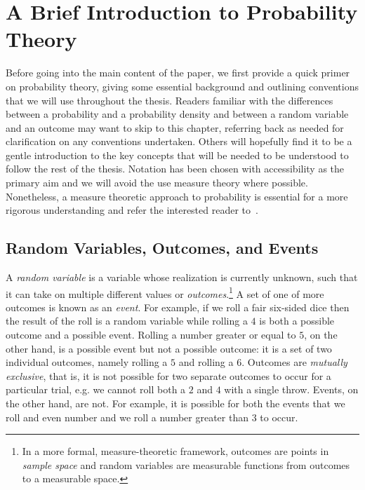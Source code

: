 
\chapter{A Brief Introduction to Probability Theory}
\label{chp:prob}

Before going into the main content of the paper, we first provide a quick primer on probability
theory, giving some essential background and outlining conventions
that we will use throughout the thesis.  Readers familiar with the differences between a probability
and a probability density and between a random variable and an outcome may want to skip to this
chapter, referring back as needed for clarification on any conventions undertaken.  Others
will hopefully find it to be a gentle introduction to the key concepts that will be needed to
be understood to follow the rest of the thesis.  Notation has been chosen with accessibility 
as the primary aim and we will avoid
the use measure theory where possible.  Nonetheless, a measure theoretic
approach to probability is essential for a more rigorous understanding and refer
the interested reader to~\cite{durrett2010probability}.

\section{Random Variables, Outcomes, and Events}
\label{sec:prob:random}

A \emph{random variable} is a variable
whose realization is currently unknown, such that it can take on multiple different
values or \emph{outcomes}.\footnote{In a more formal, measure-theoretic framework, outcomes are points in \emph{sample
		space} and random variables are measurable functions from outcomes to a measurable
	space.}
A set of one of more outcomes is known as an \emph{event}.
For example, if we roll a fair six-sided dice then the result of the roll is a random variable 
while rolling a $4$ is both a possible outcome and a possible event.  Rolling a number greater
or equal to $5$, on the other hand, is a possible event but not a possible outcome: it is a set
of two individual outcomes, namely rolling a $5$ and rolling a $6$.  Outcomes are
\emph{mutually exclusive}, that is, it is not possible for two separate outcomes to occur for a particular trial, e.g.
we cannot roll both a $2$ and $4$ with a single throw.
Events, on the other hand, are not. For example, it is possible for both the events that we
roll and even number and we roll a number greater than $3$ to occur.

